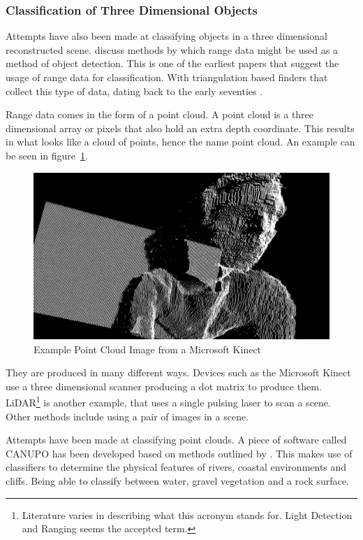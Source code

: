 \documentclass[11pt,oneside]{report}
\begin{document}
					\subsubsection{Classification of Three Dimensional Objects}
				Attempts have also been made at classifying objects in a three dimensional reconstructed scene.
				 discuss methods by which range data might be used as a method of object detection.
				This is one of the earliest papers that suggest the usage of range data for classification.
				With triangulation based finders that collect this type of data, dating back to the early seventies \cite{journal:range}.
				
				Range data comes in the form of a point cloud.
				A point cloud is a three dimensional array or pixels that also hold an extra depth coordinate.
				This results in what looks like a cloud of points, hence the name point cloud.
				An example can be seen in figure~\ref{fig:example_pc}.
				\begin{figure}[!h]
				\centering
					
    					\includegraphics[width=\textwidth]{example_pc}
    					\caption{Example Point Cloud Image from a Microsoft Kinect \protect\cite{video:pc} {\label{fig:example_pc}}}

				\end{figure}	
				They are produced in many different ways. Devices such as the Microsoft Kinect use a three dimensional scanner producing a dot matrix to produce them.
				LiDAR\footnote{Literature varies in describing what this acronym stands for. Light Detection and Ranging seems the accepted term.} is another example, that uses a single pulsing laser to scan a scene.
				Other methods include using a pair of images in a scene.
				
				Attempts have been made at classifying point clouds. A piece of software called CANUPO has been developed based on methods outlined by .
				This makes use of classifiers to determine the physical features of rivers, coastal environments and cliffs.
				Being able to classify between water, gravel vegetation and a rock surface.
					
\end{document}

